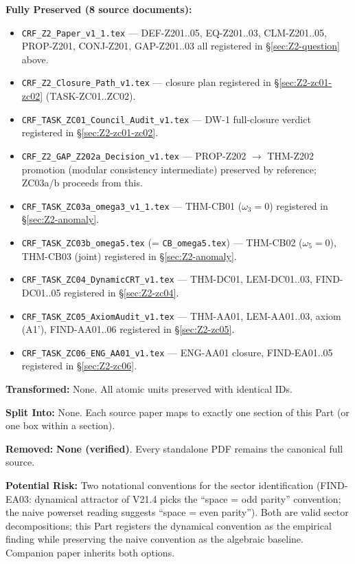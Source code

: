\documentclass[12pt, a4paper]{article}
\begin{document}
\begin{formalbox}[title={Master Loss Audit (CUIP STEP 6)}]
\textbf{Fully Preserved (8 source documents):}
\begin{itemize}[leftmargin=*]
\item \texttt{CRF\_Z2\_Paper\_v1\_1.tex} --- DEF-Z201..05, EQ-Z201..03,
  CLM-Z201..05, PROP-Z201, CONJ-Z201, GAP-Z201..03 all registered
  in \S\ref{sec:Z2-question} above.
\item \texttt{CRF\_Z2\_Closure\_Path\_v1.tex} --- closure plan
  registered in \S\ref{sec:Z2-zc01-zc02} (TASK-ZC01..ZC02).
\item \texttt{CRF\_TASK\_ZC01\_Council\_Audit\_v1.tex} --- DW-1
  full-closure verdict registered in \S\ref{sec:Z2-zc01-zc02}.
\item \texttt{CRF\_Z2\_GAP\_Z202a\_Decision\_v1.tex} --- PROP-Z202
  $\to$ THM-Z202 promotion (modular consistency intermediate)
  preserved by reference; ZC03a/b proceeds from this.
\item \texttt{CRF\_TASK\_ZC03a\_omega3\_v1\_1.tex} --- THM-CB01
  ($\omega_3 = 0$) registered in \S\ref{sec:Z2-anomaly}.
\item \texttt{CRF\_TASK\_ZC03b\_omega5.tex} (= \texttt{CB\_omega5.tex})
  --- THM-CB02 ($\omega_5 = 0$), THM-CB03 (joint) registered in
  \S\ref{sec:Z2-anomaly}.
\item \texttt{CRF\_TASK\_ZC04\_DynamicCRT\_v1.tex} --- THM-DC01,
  LEM-DC01..03, FIND-DC01..05 registered in \S\ref{sec:Z2-zc04}.
\item \texttt{CRF\_TASK\_ZC05\_AxiomAudit\_v1.tex} --- THM-AA01,
  LEM-AA01..03, axiom (A1'), FIND-AA01..06 registered in
  \S\ref{sec:Z2-zc05}.
\item \texttt{CRF\_TASK\_ZC06\_ENG\_AA01\_v1.tex} --- ENG-AA01
  closure, FIND-EA01..05 registered in \S\ref{sec:Z2-zc06}.
\end{itemize}

\textbf{Transformed:} None. All atomic units preserved with
identical IDs.

\textbf{Split Into:} None. Each source paper maps to exactly one
section of this Part (or one box within a section).

\textbf{Removed:} \textbf{None (verified)}. Every standalone PDF
remains the canonical full source.

\textbf{Potential Risk:} Two notational conventions for the sector
identification (FIND-EA03: dynamical attractor of V21.4 picks the
``space = odd parity'' convention; the naive powerset reading
suggests ``space = even parity''). Both are valid sector
decompositions; this Part registers the dynamical convention as
the empirical finding while preserving the naive convention as the
algebraic baseline. Companion paper inherits both options.
\end{formalbox}
\end{document}
